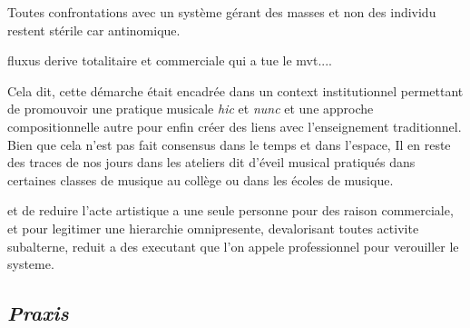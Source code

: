 \documentclass{article}
\begin{document}
Toutes confrontations avec un système gérant des masses et non des individu restent stérile car antinomique.

fluxus derive totalitaire et commerciale qui a tue le mvt....

Cela dit, cette démarche était encadrée dans un context institutionnel permettant de promouvoir une pratique musicale \textit{hic}  et \textit{nunc} et une approche compositionnelle autre pour enfin créer des liens avec l'enseignement traditionnel. Bien que cela n'est pas fait consensus dans le temps et dans l'espace, Il en reste des traces de nos jours dans les ateliers dit d'éveil musical pratiqués dans certaines classes de musique au collège ou dans les écoles de musique. 



et de reduire l'acte artistique a une seule personne pour des raison commerciale, et pour legitimer une hierarchie omnipresente, devalorisant toutes activite subalterne, reduit a des executant que l'on appele professionnel pour verouiller le systeme.


\subsection{\textit{Praxis}} 
\end{document}
